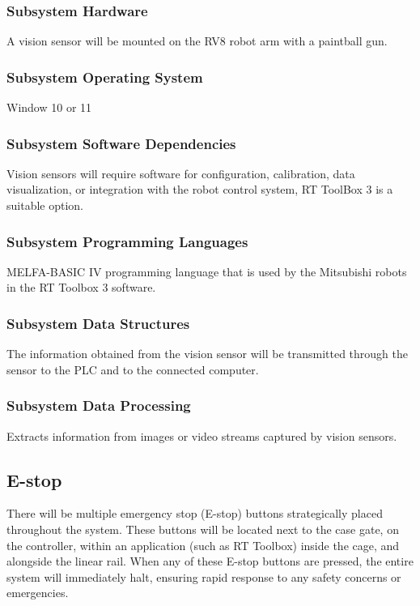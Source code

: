 \subsubsection{Subsystem Hardware}
A vision sensor will be mounted on the RV8 robot arm with a paintball gun.

\subsubsection{Subsystem Operating System}
Window 10 or 11

\subsubsection{Subsystem Software Dependencies}
Vision sensors will require software for configuration, calibration, data visualization, or integration with the robot control system, RT ToolBox 3 is a suitable option.

\subsubsection{Subsystem Programming Languages}
MELFA-BASIC IV programming language that is used by the Mitsubishi robots in the RT Toolbox 3 software.

\subsubsection{Subsystem Data Structures}
The information obtained from the vision sensor will be transmitted through the sensor to the PLC and to the connected computer.

\subsubsection{Subsystem Data Processing}
Extracts information from images or video streams captured by vision sensors.

\subsection{E-stop}
There will be multiple emergency stop (E-stop) buttons strategically placed throughout the system. These buttons will be located next to the case gate, on the controller, within an application (such as RT Toolbox) inside the cage, and alongside the linear rail. When any of these E-stop buttons are pressed, the entire system will immediately halt, ensuring rapid response to any safety concerns or emergencies.


